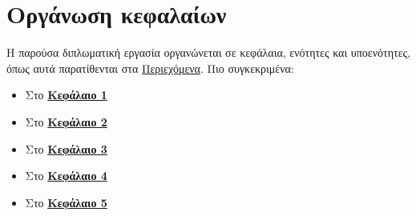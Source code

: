 \section{Οργάνωση κεφαλαίων}

Η παρούσα διπλωματική εργασία οργανώνεται σε κεφάλαια, ενότητες και υποενότητες, όπως αυτά παρατίθενται στα \hyperref[toc]{Περιεχόμενα}. Πιο συγκεκριμένα:

\begin{itemize}
	\item Στο \hyperref[chapter:1-introduction]{\textbf{Κεφάλαιο 1}}
	\item Στο \hyperref[chapter:2-theoretical-background]{\textbf{Κεφάλαιο 2}}
	\item Στο \hyperref[chapter:3-application-design]{\textbf{Κεφάλαιο 3}}
	\item Στο \hyperref[chapter:4-application-implementation]{\textbf{Κεφάλαιο 4}}
	\item Στο \hyperref[chapter:5-conclusions-open-areas]{\textbf{Κεφάλαιο 5}}
\end{itemize}